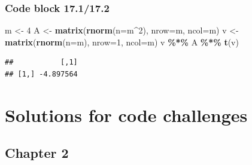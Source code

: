 \documentclass[
]{book}
\newenvironment{Shaded}{\begin{snugshade}}{\end{snugshade}}
\newcommand{\DataTypeTok}[1]{\textcolor[rgb]{0.13,0.29,0.53}{#1}}
\newcommand{\DecValTok}[1]{\textcolor[rgb]{0.00,0.00,0.81}{#1}}
\newcommand{\KeywordTok}[1]{\textcolor[rgb]{0.13,0.29,0.53}{\textbf{#1}}}
\newcommand{\NormalTok}[1]{#1}
\newcommand{\OperatorTok}[1]{\textcolor[rgb]{0.81,0.36,0.00}{\textbf{#1}}}
\newcommand{\StringTok}[1]{\textcolor[rgb]{0.31,0.60,0.02}{#1}}
\begin{document}
\hypertarget{code-block-17.117.2}{%
\subsection*{Code block 17.1/17.2}\label{code-block-17.117.2}}

\begin{Shaded}
\begin{Highlighting}[]
\NormalTok{m \textless{}{-}}\StringTok{ }\DecValTok{4}
\NormalTok{A \textless{}{-}}\StringTok{ }\KeywordTok{matrix}\NormalTok{(}\KeywordTok{rnorm}\NormalTok{(}\DataTypeTok{n=}\NormalTok{m}\OperatorTok{\^{}}\DecValTok{2}\NormalTok{), }\DataTypeTok{nrow=}\NormalTok{m, }\DataTypeTok{ncol=}\NormalTok{m)}
\NormalTok{v \textless{}{-}}\StringTok{ }\KeywordTok{matrix}\NormalTok{(}\KeywordTok{rnorm}\NormalTok{(}\DataTypeTok{n=}\NormalTok{m), }\DataTypeTok{nrow=}\DecValTok{1}\NormalTok{, }\DataTypeTok{ncol=}\NormalTok{m)}
\NormalTok{v }\OperatorTok{\%*\%}\StringTok{ }\NormalTok{A }\OperatorTok{\%*\%}\StringTok{ }\KeywordTok{t}\NormalTok{(v)}
\end{Highlighting}
\end{Shaded}

\begin{verbatim}
##           [,1]
## [1,] -4.897564
\end{verbatim}

\hypertarget{solutions-for-code-challenges}{%
\chapter*{Solutions for code challenges}\label{solutions-for-code-challenges}}

\hypertarget{chapter-2-1}{%
\section*{Chapter 2}\label{chapter-2-1}}
\end{document}
